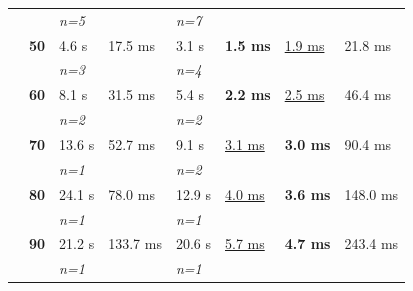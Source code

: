 \documentclass{juliacon}
\numberwithin{equation}{section}
\begin{document}
\begin{table}
\begin{tabular}{clllllll}
                                &             & \textit{n=5}      &                              & \textit{n=7}     &                                &                              &                              \\
                                & \textbf{50} & 4.6 s             & 17.5 ms                      & 3.1 s            & \textbf{1.5 ms}                & \underline{1.9 ms}           & 21.8 ms                      \\
                                &             & \textit{n=3}      &                              & \textit{n=4}     &                                &                              &                              \\
                                & \textbf{60} & 8.1 s             & 31.5 ms                      & 5.4 s            & \textbf{2.2 ms}                & \underline{2.5 ms}           & 46.4 ms                      \\
                                &             & \textit{n=2}      &                              & \textit{n=2}     &                                &                              &                              \\
                                & \textbf{70} & 13.6 s            & 52.7 ms                      & 9.1 s            & \underline{3.1 ms}             & \textbf{3.0 ms}              & 90.4 ms                      \\
                                &             & \textit{n=1}      &                              & \textit{n=2}     &                                &                              &                              \\
                                & \textbf{80} & 24.1 s            & 78.0 ms                      & 12.9 s           & \underline{4.0 ms}             & \textbf{3.6 ms}              & 148.0 ms                     \\
                                &             & \textit{n=1}      &                              & \textit{n=1}     &                                &                              &                              \\
                                & \textbf{90} & 21.2 s            & 133.7 ms                     & 20.6 s           & \underline{5.7 ms}             & \textbf{4.7 ms}              & 243.4 ms                     \\
                                &             & \textit{n=1}      &                              & \textit{n=1}     &                                &                              &                              \\

\end{tabular}
\end{table}
\end{document}
